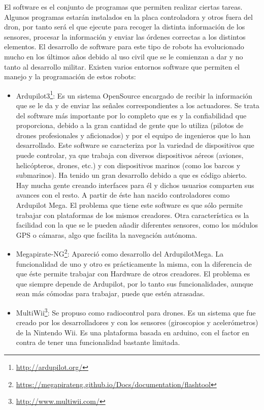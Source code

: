 El software es el conjunto de programas que permiten realizar ciertas tareas. Algunos programas estarán instalados en la placa controladora y otros fuera del dron, por tanto será el que ejecute para recoger la distinta información de los sensores, procesar la información y enviar las órdenes correctas a los distintos elementos. El desarrollo de software para este tipo de robots ha evolucionado mucho en los últimos años debido al uso civil que se le comienzan a dar y no tanto al desarrollo militar. Existen varios entornos software que permiten el manejo y la programación de estos robots:
\begin{itemize}
\item Ardupilot3\footnote{\url{http://ardupilot.org/}}: Es un sistema OpenSource encargado de recibir la información que se le da y de enviar las señales correspondientes a los actuadores. Se trata del software más importante por lo completo que es y la confiabilidad que proporciona, debido a la gran cantidad de gente que lo utiliza (pilotos de drones profesionales y aficionados) y por el equipo de ingenieros que lo han desarrollado. Este software se caracteriza por la variedad de dispositivos que puede controlar, ya que trabaja con diversos dispositivos aéreos (aviones, helicópteros, drones, etc.) y con dispositivos marinos (como los barcos y submarinos). Ha tenido un gran desarrollo debido a que es código abierto. Hay mucha gente creando interfaces para él y dichos usuarios comparten sus avances con el resto. A partir de éste han nacido controladores como Ardupilot Mega. El problema que tiene este software es que sólo permite trabajar con plataformas de los mismos creadores. Otra característica es la facilidad con la que se le pueden añadir diferentes sensores, como los módulos GPS o cámaras, algo que facilita la navegación autónoma.
\item Megapirate-NG\footnote{\url{https://megapirateng.github.io/Docs/documentation/flashtool}}: Apareció como desarrollo del ArdupilotMega. La funcionalidad de
uno y otro es prácticamente la misma, con la diferencia de que éste permite
trabajar con Hardware de otros creadores. El problema es que siempre depende
de Ardupilot, por lo tanto sus funcionalidades, aunque sean más cómodas para
trabajar, puede que estén atrasadas.
\item MultiWii\footnote{\url{http://www.multiwii.com/}}: Se propuso como radiocontrol para drones. Es un sistema que fue
creado por los desarrolladores y con los sensores (giroscopios y acelerómetros) de
la Nintendo Wii. Es una plataforma basada en arduino, con el factor en contra
de tener una funcionalidad bastante limitada.

\end{itemize}

